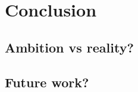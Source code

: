 \documentclass[Report.tex]{subfiles}
\begin{document}
\chapter{Conclusion}
\label{sec:Conclusion}
\section{Ambition vs reality?}
\section{Future work?}
\end{document}
